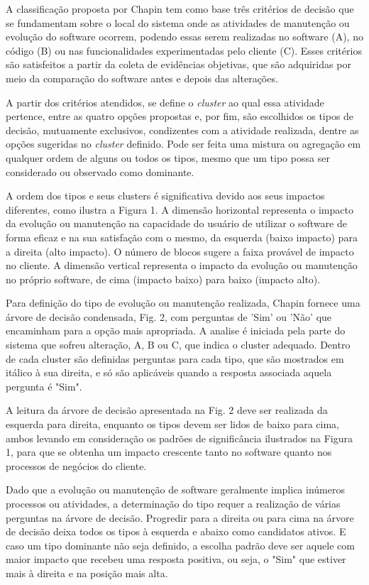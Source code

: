 A classificação proposta por Chapin tem como base três critérios de decisão que se fundamentam sobre o 
local do sistema onde as atividades de manutenção ou evolução do software ocorrem, podendo essas serem 
realizadas no software (A), no código (B) ou nas funcionalidades experimentadas pelo cliente (C). 
Esses critérios são satisfeitos a partir da coleta de evidências objetivas, que são adquiridas 
por meio da comparação do software antes e depois das alterações.

A partir dos critérios atendidos, se define o \textit{cluster} ao qual essa atividade pertence, 
entre as quatro opções propostas e, por fim, são escolhidos os tipos de decisão, mutuamente exclusivos, 
condizentes com a atividade realizada, dentre as opções sugeridas no \textit{cluster} definido. 
Pode ser feita uma mistura ou agregação em qualquer ordem de alguns ou todos os tipos, mesmo que 
um tipo possa ser considerado ou observado como dominante.

A ordem dos tipos e seus clusters é significativa devido aos seus impactos diferentes, como ilustra 
a Figura 1. A dimensão horizontal representa o impacto da evolução ou manutenção na capacidade do 
usuário de utilizar o software de forma eficaz e na sua satisfação com o mesmo, da esquerda 
(baixo impacto) para a direita (alto impacto). O número de blocos sugere a faixa provável de impacto 
no cliente. A dimensão vertical representa o impacto da evolução ou manutenção no próprio software, 
de cima (impacto baixo) para baixo (impacto alto).


Para definição do tipo de evolução ou manutenção realizada, Chapin fornece uma árvore de decisão 
condensada, Fig. 2, com perguntas de 'Sim' ou 'Não' que encaminham para a opção mais apropriada. 
A analise é iniciada pela parte do sistema que sofreu alteração, A, B ou C, que indica o cluster 
adequado. Dentro de cada cluster são definidas perguntas para cada tipo, que são mostrados em itálico 
à sua direita, e só são aplicáveis quando a resposta associada aquela pergunta é "Sim". 

A leitura da árvore de decisão apresentada na Fig. 2 deve ser realizada da esquerda para direita, 
enquanto os tipos devem ser lidos de baixo para cima, ambos levando em consideração os padrões de 
significância ilustrados na Figura 1, para que se obtenha um impacto crescente tanto no software 
quanto nos processos de negócios do cliente.

Dado que a evolução ou manutenção de software geralmente implica inúmeros processos ou atividades, a 
determinação do tipo requer a realização de várias perguntas na árvore de decisão. Progredir para a 
direita ou para cima na árvore de decisão deixa todos os tipos à esquerda e abaixo como candidatos ativos. 
E caso um tipo dominante não seja definido, a escolha padrão deve ser aquele com maior impacto que 
recebeu uma resposta positiva, ou seja, o "Sim" que estiver mais à direita e na posição mais alta.

